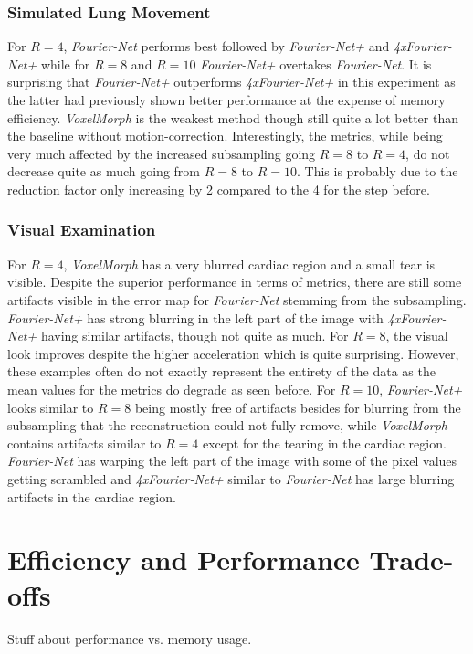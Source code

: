 \subsubsection{Simulated Lung Movement}
For $R=4$, \emph{Fourier-Net} performs best followed by \emph{Fourier-Net+} and \emph{4xFourier-Net+} while for $R=8$ and $R=10$ \emph{Fourier-Net+} overtakes \emph{Fourier-Net}. It is surprising that \emph{Fourier-Net+} outperforms \emph{4xFourier-Net+} in this experiment as the latter had previously shown better performance at the expense of memory efficiency. \emph{VoxelMorph} is the weakest method though still quite a lot better than the baseline without motion-correction. Interestingly, the metrics, while being very much affected by the increased subsampling going $R=8$ to $R=4$, do not decrease quite as much going from $R=8$ to $R=10$. This is probably due to the reduction factor only increasing by 2 compared to the 4 for the step before. 

\subsubsection{Visual Examination}
For $R=4$, \emph{VoxelMorph} has a very blurred cardiac region and a small tear is visible. Despite the superior performance in terms of metrics, there are still some artifacts visible in the error map for \emph{Fourier-Net} stemming from the subsampling. \emph{Fourier-Net+} has strong blurring in the left part of the image with \emph{4xFourier-Net+} having similar artifacts, though not quite as much. For $R=8$, the visual look improves despite the higher acceleration which is quite surprising. However, these examples often do not exactly represent the entirety of the data as the mean values for the metrics do degrade as seen before. For $R=10$, \emph{Fourier-Net+} looks similar to $R=8$ being mostly free of artifacts besides for blurring from the subsampling that the reconstruction could not fully remove, while \emph{VoxelMorph} contains artifacts similar to $R=4$ except for the tearing in the cardiac region. \emph{Fourier-Net} has warping the left part of the image with some of the pixel values getting scrambled and \emph{4xFourier-Net+} similar to \emph{Fourier-Net} has large blurring artifacts in the cardiac region.

\section{Efficiency and Performance Trade-offs}
Stuff about performance vs. memory usage.

